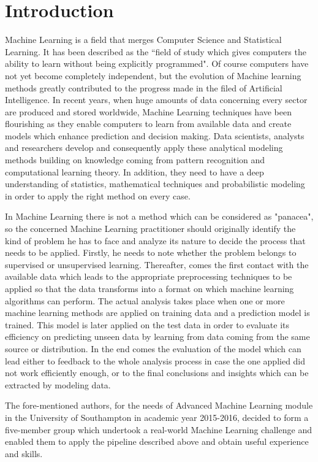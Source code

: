 \documentclass[conference, onecolumn]{IEEEtran}
\begin{document}
\section{Introduction}
Machine Learning is a field that merges Computer Science and Statistical Learning. It has been described as the ``field of study which gives computers the ability to learn without being explicitly programmed"\cite{ml1}. Of course computers have not yet become completely independent, but the evolution of Machine learning methods greatly contributed to the progress made in the filed of Artificial Intelligence. In recent years, when huge amounts of data concerning every sector are produced and stored worldwide,  Machine Learning techniques have been flourishing as they enable computers to learn from available data and create models which enhance prediction and decision making. Data scientists, analysts and researchers develop and consequently apply these analytical modeling methods building on knowledge coming from pattern recognition and computational learning theory.  In addition, they need to have a deep understanding of statistics, mathematical techniques and probabilistic modeling in order to apply the right method on every case. 

In Machine Learning there is not a method which can be considered as "panacea", so the concerned Machine Learning practitioner should originally identify the kind of problem he has to face and analyze its nature to decide the process that needs to be applied. Firstly, he needs to note whether the problem belongs to supervised or unsupervised learning. Thereafter, comes the first contact with the available data which leads to the appropriate preprocessing techniques to be applied so that the data transforms into a format on which machine learning algorithms can perform. The actual analysis takes place when one or more machine learning methods are applied on training data and a prediction model is trained. This model is later applied on the test data in order to evaluate its efficiency on predicting unseen data by learning from data coming from the same source or distribution. In the end comes the evaluation of the model which can lead either to feedback to the whole analysis process in case the one applied did not work efficiently enough, or to the final conclusions and insights which can be extracted by modeling data.

The fore-mentioned authors, for the needs of Advanced Machine Learning module in the University of Southampton in academic year 2015-2016, decided to form a five-member group which undertook a real-world Machine Learning challenge and enabled them to apply the pipeline described above and obtain useful experience and skills.
\end{document}
